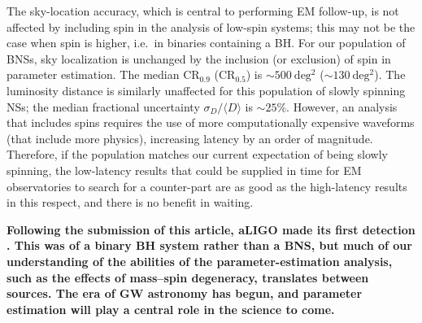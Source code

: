 The sky-location accuracy, which is central to performing EM follow-up, is not affected by including spin in the analysis of low-spin systems; this may not be the case when spin is higher, i.e.\ in binaries containing a BH. For our population of BNSs, sky localization is unchanged by the inclusion (or exclusion) of spin in parameter estimation. The median $\mathrm{CR}_{0.9}$ ($\mathrm{CR}_{0.5}$) is $\sim 500~\mathrm{deg^2}$ ($\sim 130~\mathrm{deg^2}$). The luminosity distance is similarly unaffected for this population of slowly spinning NSs; the median fractional uncertainty $\sigma_D/\langle D \rangle$ is $\sim 25\%$.  However, an analysis that includes spins requires the use of more computationally expensive waveforms (that include more physics), increasing latency by an order of magnitude.  Therefore, if the population matches our current expectation of being slowly spinning, the low-latency results that could be supplied in time for EM observatories to search for a counter-part are as good as the high-latency results in this respect, and there is no benefit in waiting.

\textbf{Following the submission of this article, aLIGO made its first detection \citep{Abbott:2016blz}. This was of a binary BH system \citep{TheLIGOScientific:2016wfe} rather than a BNS, but much of our understanding of the abilities of the parameter-estimation analysis, such as the effects of mass--spin degeneracy, translates between sources. The era of GW astronomy has begun, and parameter estimation will play a central role in the science to come.}